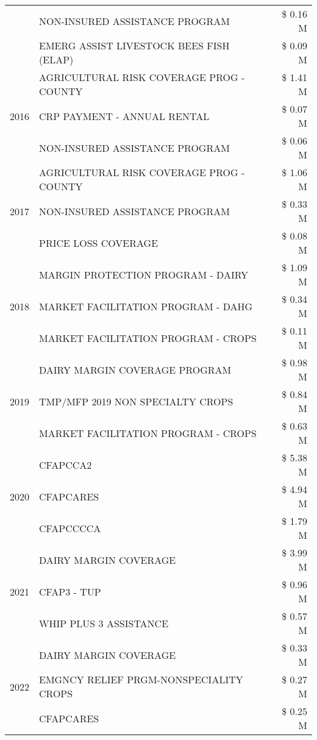 \begin{tabular}{llr}
 & NON-INSURED ASSISTANCE PROGRAM & \$ 0.16 M \\
 & EMERG ASSIST LIVESTOCK BEES FISH (ELAP) & \$ 0.09 M \\
\cline{1-3}
\multirow[t]{3}{*}{2016} & AGRICULTURAL RISK COVERAGE PROG - COUNTY & \$ 1.41 M \\
 & CRP PAYMENT - ANNUAL RENTAL & \$ 0.07 M \\
 & NON-INSURED ASSISTANCE PROGRAM & \$ 0.06 M \\
\cline{1-3}
\multirow[t]{3}{*}{2017} & AGRICULTURAL RISK COVERAGE PROG - COUNTY & \$ 1.06 M \\
 & NON-INSURED ASSISTANCE PROGRAM & \$ 0.33 M \\
 & PRICE LOSS COVERAGE & \$ 0.08 M \\
\cline{1-3}
\multirow[t]{3}{*}{2018} & MARGIN PROTECTION PROGRAM - DAIRY & \$ 1.09 M \\
 & MARKET FACILITATION PROGRAM - DAHG & \$ 0.34 M \\
 & MARKET FACILITATION PROGRAM - CROPS & \$ 0.11 M \\
\cline{1-3}
\multirow[t]{3}{*}{2019} & DAIRY MARGIN COVERAGE PROGRAM & \$ 0.98 M \\
 & TMP/MFP 2019 NON SPECIALTY CROPS & \$ 0.84 M \\
 & MARKET FACILITATION PROGRAM - CROPS & \$ 0.63 M \\
\cline{1-3}
\multirow[t]{3}{*}{2020} & CFAPCCA2 & \$ 5.38 M \\
 & CFAPCARES & \$ 4.94 M \\
 & CFAPCCCCA & \$ 1.79 M \\
\cline{1-3}
\multirow[t]{3}{*}{2021} & DAIRY MARGIN COVERAGE & \$ 3.99 M \\
 & CFAP3 - TUP & \$ 0.96 M \\
 & WHIP PLUS 3 ASSISTANCE & \$ 0.57 M \\
\cline{1-3}
\multirow[t]{3}{*}{2022} & DAIRY MARGIN COVERAGE & \$ 0.33 M \\
 & EMGNCY RELIEF PRGM-NONSPECIALITY CROPS & \$ 0.27 M \\
 & CFAPCARES & \$ 0.25 M \\
\cline{1-3}
\bottomrule
\end{tabular}
